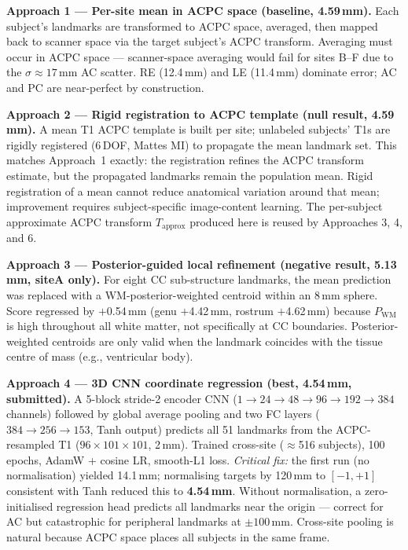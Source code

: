 \documentclass[11pt,letterpaper]{article}
\begin{document}
\textbf{Approach 1 — Per-site mean in ACPC space (baseline, 4.59\,mm).}
Each subject's landmarks are transformed to ACPC space, averaged, then mapped back to
scanner space via the target subject's ACPC transform.
Averaging must occur in ACPC space — scanner-space averaging would fail for sites B--F due to
the $\sigma\approx17$\,mm AC scatter.
RE (12.4\,mm) and LE (11.4\,mm) dominate error; AC and PC are near-perfect by construction.

\textbf{Approach 2 — Rigid registration to ACPC template (null result, 4.59\,mm).}
A mean T1 ACPC template is built per site; unlabeled subjects' T1s are rigidly registered
(6\,DOF, Mattes MI) to propagate the mean landmark set.
This matches Approach~1 exactly: the registration refines the ACPC transform estimate, but
the propagated landmarks remain the population mean.
Rigid registration of a mean cannot reduce anatomical variation around that mean; improvement
requires subject-specific image-content learning.
The per-subject approximate ACPC transform $T_\text{approx}$ produced here is reused by
Approaches 3, 4, and 6.

\textbf{Approach 3 — Posterior-guided local refinement (negative result, 5.13\,mm, siteA only).}
For eight CC sub-structure landmarks, the mean prediction was replaced with a
WM-posterior-weighted centroid within an 8\,mm sphere.
Score regressed by $+$0.54\,mm (genu $+$4.42\,mm, rostrum $+$4.62\,mm) because
$P_\text{WM}$ is high throughout all white matter, not specifically at CC boundaries.
Posterior-weighted centroids are only valid when the landmark coincides with the tissue
centre of mass (e.g., ventricular body).

\textbf{Approach 4 — 3D CNN coordinate regression (best, 4.54\,mm, submitted).}
A 5-block stride-2 encoder CNN ($1{\to}24{\to}48{\to}96{\to}192{\to}384$ channels)
followed by global average pooling and two FC layers ($384{\to}256{\to}153$, Tanh output)
predicts all 51 landmarks from the ACPC-resampled T1 ($96{\times}101{\times}101$, 2\,mm).
Trained cross-site ($\approx$516 subjects), 100 epochs, AdamW + cosine LR, smooth-L1 loss.
\emph{Critical fix:} the first run (no normalisation) yielded 14.1\,mm; normalising targets
by 120\,mm to $[-1,+1]$ consistent with Tanh reduced this to \textbf{4.54\,mm}.
Without normalisation, a zero-initialised regression head predicts all landmarks near the
origin — correct for AC but catastrophic for peripheral landmarks at $\pm100$\,mm.
Cross-site pooling is natural because ACPC space places all subjects in the same frame.
\end{document}
